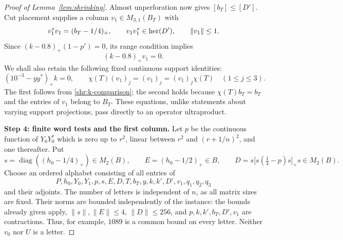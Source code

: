 \begin{proof}[Proof of Lemma~\ref{lem:shrinking}]
Almost unperforation now gives $[b_T]\le[D']$.  Cut placement supplies a
column $v_1\in M_{3,1}(B_T)$ with
\begin{equation}\label{shr:v1}
 v_1^*v_1=(b_T-1/4)_+,\qquad
 v_1v_1^*\in\operatorname{her}(D'),\qquad \|v_1\|\le1.
\end{equation}
Since $(k-0.8)_+(1-p')=0$, its range condition implies
\begin{equation}\label{shr:v1-annihilation}
 (k-0.8)_+v_1=0.
\end{equation}
We shall also retain the following fixed continuous support identities:
\begin{equation}\label{shr:fixed-supports}
 (10^{-3}-yy^*)_+k=0,\qquad
 \chi(T)(v_1)_j=(v_1)_j=(v_1)_j\chi(T)\quad(1\le j\le3).
\end{equation}
The first follows from \eqref{shr:k-comparison}; the second holds because
$\chi(T)b_T=b_T$ and the entries of $v_1$ belong to $B_T$.  These equations,
unlike statements about varying support projections, pass directly to an
operator ultraproduct.

\medskip
\noindent\textbf{Step 4: finite word tests and the first column.}
Let $p$ be the continuous function of $Y_0Y_0^*$ which is zero up to
$r^2$, linear between $r^2$ and $(r+1/n)^2$, and one thereafter.  Put
\begin{equation}\label{shr:DE}
 s=\operatorname{diag}((h_0-1/4)_+)\in M_2(B),\qquad
 E=(h_0-1/2)_+\in B,\qquad
 D=s\bigl[s(\tfrac14-p)s\bigr]_+s\in M_2(B).
\end{equation}
Choose an ordered alphabet consisting of all entries of
\begin{equation}\label{shr:alphabet}
 P,h_0,Y_0,Y_1,p,s,E,D,T,b_T,y,k,k',D',v_1,q_1,q_2,q_3
\end{equation}
and their adjoints.  The number of letters is independent of $n$, as all
matrix sizes are fixed.  Their norms are bounded independently of the
instance: the bounds already given apply, $\|s\|,\|E\|\le4$,
$\|D\|\le256$, and $p,k,k',b_T,D',v_1$ are contractions.  Thus, for
example, $1089$ is a common bound on every letter.  Neither $v_0$ nor $U$
is a letter.


\end{proof}
